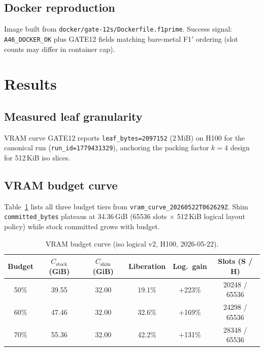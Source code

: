 \documentclass[11pt]{article}
\begin{document}
\subsection{Docker reproduction}
Image built from \texttt{docker/gate-12s/Dockerfile.f1prime}.
Success signal: \texttt{A46\_DOCKER\_OK} plus GATE12 fields matching bare-metal F1$'$ ordering (slot counts may differ in container cap).

\section{Results}
\label{sec:results}

\subsection{Measured leaf granularity}
VRAM curve GATE12 reports \texttt{leaf\_bytes=2097152} (2\,MiB) on H100 for the canonical run (\texttt{run\_id=1779431329}), anchoring the packing factor $k=4$ design for 512\,KiB iso slices.

\subsection{VRAM budget curve}
Table~\ref{tab:curve} lists all three budget tiers from \texttt{vram\_curve\_20260522T062629Z}.
Shim \texttt{committed\_bytes} plateaus at 34.36\,GiB (65536 slots $\times$ 512\,KiB logical layout policy) while stock committed grows with budget.

\begin{table}[ht]
\centering
\caption{VRAM budget curve (iso logical v2, H100, 2026-05-22).}
\label{tab:curve}
\small
\begin{tabular}{@{}cccccc@{}}
\toprule
Budget & $C_{\mathrm{stock}}$ (GiB) & $C_{\mathrm{shim}}$ (GiB) & Liberation & Log.\ gain & Slots (S / H) \\
\midrule
50\% & 39.55 & 32.00 & 19.1\% & +223\% & 20248 / 65536 \\
60\% & 47.46 & 32.00 & 32.6\% & +169\% & 24298 / 65536 \\
70\% & 55.36 & 32.00 & 42.2\% & +131\% & 28348 / 65536 \\
\bottomrule
\end{tabular}
\end{table}
\end{document}
